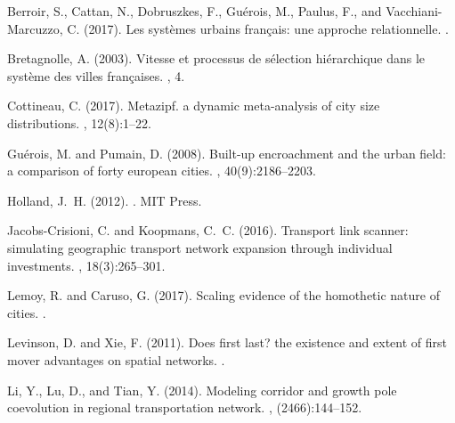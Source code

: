\begin{thebibliography}{}

Berroir, S., Cattan, N., Dobruszkes, F., Gu{\'e}rois, M., Paulus, F., and
  Vacchiani-Marcuzzo, C. (2017).
\newblock Les syst{\`e}mes urbains fran{\c{c}}ais: une approche relationnelle.
.

Bretagnolle, A. (2003).
\newblock Vitesse et processus de s{\'e}lection hi{\'e}rarchique dans le
  syst{\`e}me des villes fran{\c{c}}aises.
, 4.

Cottineau, C. (2017).
\newblock Metazipf. a dynamic meta-analysis of city size distributions.
, 12(8):1--22.

Gu{\'e}rois, M. and Pumain, D. (2008).
\newblock Built-up encroachment and the urban field: a comparison of forty
  european cities.
, 40(9):2186--2203.

Holland, J.~H. (2012).
.
\newblock MIT Press.

Jacobs-Crisioni, C. and Koopmans, C.~C. (2016).
\newblock Transport link scanner: simulating geographic transport network
  expansion through individual investments.
, 18(3):265--301.

Lemoy, R. and Caruso, G. (2017).
\newblock Scaling evidence of the homothetic nature of cities.
.

Levinson, D. and Xie, F. (2011).
\newblock Does first last? the existence and extent of first mover advantages
  on spatial networks.
.

Li, Y., Lu, D., and Tian, Y. (2014).
\newblock Modeling corridor and growth pole coevolution in regional
  transportation network.
, (2466):144--152.


\end{thebibliography}
